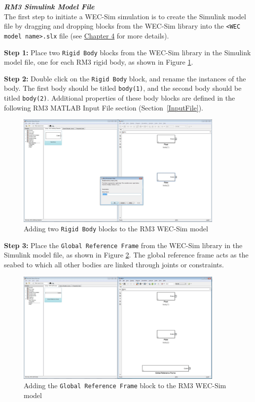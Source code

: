\textbf{\textit{RM3 Simulink Model File}}\\
The first step to initiate a WEC-Sim simulation is to create the Simulink model file by dragging and dropping blocks from the WEC-Sim library into the \texttt{<WEC model name>.slx} file (see \hyperlink{chapter.4}{Chapter 4} for more details). 

\textbf{Step 1:} Place two \texttt{Rigid Body} blocks from the WEC-Sim library in the Simulink model file, one for each RM3 rigid body, as shown in Figure \ref{RM3_WECSim_Body2}. 

\textbf{Step 2:} Double click on the \texttt{Rigid Body} block, and rename the instances of the body. The first body should be titled \texttt{body(1)}, and the second body should be titled \texttt{body(2)}. Additional properties of these body blocks are defined in the following RM3 MATLAB Input File section (Section~\ref{InputFile}). 

        \begin{figure}[H]
        \centering
        \includegraphics[width=0.9\textwidth]{application/images/RM3_WECSim_Body}
        \caption{Adding two \texttt{Rigid Body} blocks to the RM3 WEC-Sim model}
        \label{RM3_WECSim_Body2}
        \end{figure}

\textbf{Step 3:} Place the \texttt{Global Reference Frame} from the WEC-Sim library in the Simulink model file, as shown in Figure \ref{RM3_WECSim_SeaFloor}. The global reference frame acts as the seabed to which all other bodies are linked through joints or constraints.

        \begin{figure}[H]
        \centering
        \includegraphics[width=0.9\textwidth]{application/images/RM3_WECSim_GlobalRef}
        \caption{Adding the \texttt{Global Reference Frame} block to the RM3 WEC-Sim model}
        \label{RM3_WECSim_SeaFloor}
        \end{figure}

